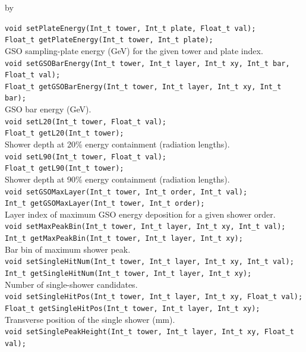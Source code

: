 \documentclass[twoside]{article}
\newcommand{\entrylabel}[1]{\mbox{\textbf{{#1}}}\hfil}%
\newenvironment{entry}
{\begin{list}{}%
    {\renewcommand{\makelabel}{\entrylabel}%
     \setlength{\labelwidth}{90pt}%
     \setlength{\leftmargin}{\labelwidth}
     \advance\leftmargin by \labelsep%
      }%
    }%
  {\end{list}}
\newcommand{\Entrylabel}[1]%
{\raisebox{0pt}[1ex][0pt]{\makebox[\labelwidth][l]%
    {\parbox[t]{\labelwidth}{\hspace{0pt}\textbf{{#1}}}}}}
\newenvironment{Entry}%
{\renewcommand{\entrylabel}{\Entrylabel}\begin{entry}}%
  {\end{entry}}
\begin{document}
\begin{Entry}
    \verb+void setPlateEnergy(Int_t tower, Int_t plate, Float_t val);+\\
    \verb+Float_t getPlateEnergy(Int_t tower, Int_t plate);+\\
    GSO sampling-plate energy (GeV) for the given tower and plate index.\\
    \verb+void setGSOBarEnergy(Int_t tower, Int_t layer, Int_t xy, Int_t bar, Float_t val);+\\
    \verb+Float_t getGSOBarEnergy(Int_t tower, Int_t layer, Int_t xy, Int_t bar);+\\
    GSO bar energy (GeV).\\
    \verb+void setL20(Int_t tower, Float_t val);+\\
    \verb+Float_t getL20(Int_t tower);+\\
    Shower depth at 20\% energy containment (radiation lengths).\\
    \verb+void setL90(Int_t tower, Float_t val);+\\
    \verb+Float_t getL90(Int_t tower);+\\
    Shower depth at 90\% energy containment (radiation lengths).\\
    \verb+void setGSOMaxLayer(Int_t tower, Int_t order, Int_t val);+\\
    \verb+Int_t getGSOMaxLayer(Int_t tower, Int_t order);+\\
    Layer index of maximum GSO energy deposition for a given shower order.\\
    \verb+void setMaxPeakBin(Int_t tower, Int_t layer, Int_t xy, Int_t val);+\\
    \verb+Int_t getMaxPeakBin(Int_t tower, Int_t layer, Int_t xy);+\\
    Bar bin of maximum shower peak.\\
    \verb+void setSingleHitNum(Int_t tower, Int_t layer, Int_t xy, Int_t val);+\\
    \verb+Int_t getSingleHitNum(Int_t tower, Int_t layer, Int_t xy);+\\
    Number of single-shower candidates.\\
    \verb+void setSingleHitPos(Int_t tower, Int_t layer, Int_t xy, Float_t val);+\\
    \verb+Float_t getSingleHitPos(Int_t tower, Int_t layer, Int_t xy);+\\
    Transverse position of the single shower (mm).\\
    \verb+void setSinglePeakHeight(Int_t tower, Int_t layer, Int_t xy, Float_t val);+\\

\end{Entry}
\end{document}
